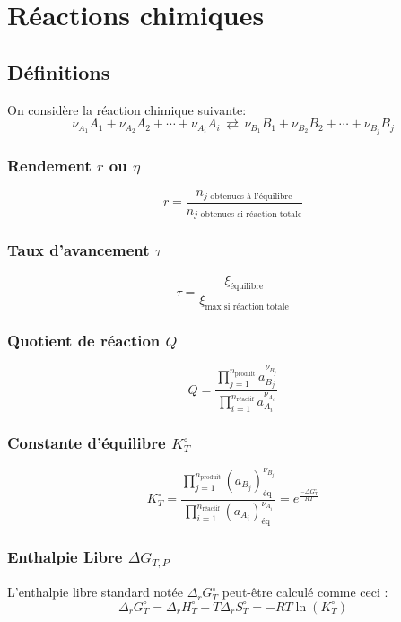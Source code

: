 \documentclass[a4paper,12pt]{article}
\begin{document}
      

        \clearpage

    \section{Réactions chimiques}

        \subsection{Définitions}
            On considère la réaction chimique suivante:
                $$ \nu_{A_1} A_1 + \nu_{A_2} A_2 + \cdots + \nu_{A_i} A_i \, \rightleftarrows \, \nu_{B_1} B_1 + \nu_{B_2} B_2 + \cdots + \nu_{B_j} B_j $$


            \subsubsection*{Rendement $r$ ou $\eta$}

                $$ \boxed{ r = \frac{n_{j \text{ obtenues à l'équilibre}}}{n_{j \text{ obtenues si réaction totale}}} } $$

            \subsubsection*{Taux d'avancement $\tau$}

                $$ \boxed{ \tau = \frac{\xi_{\text{équilibre}}}{\xi_{\text{max si réaction totale}}} } $$

            \subsubsection*{Quotient de réaction $Q$}

                $$ \boxed{ Q = \dfrac{\prod_{j=1}^{n_{\text{produit}}} a_{B_j}^{\nu_{B_j}}}{\prod_{i=1}^{n_{\text{réactif}}} a_{A_i}^{\nu_{A_i}}} } $$ 

            \subsubsection*{Constante d'équilibre $K_T^{\circ}$}

                $$ \boxed{ K_T^{\circ} = \dfrac{\prod_{j=1}^{n_{\text{produit}}} (a_{B_j})_{\text{éq}}^{\nu_{B_j}} }{\prod_{i=1}^{n_{\text{réactif}}} (a_{A_i})_{\text{éq}}^{\nu_{A_i}}} = e^{\frac{-\Delta G_T^{\circ}}{RT}} }$$

            \subsubsection*{Enthalpie Libre $\Delta G_{T,P}$}
                L'enthalpie libre standard notée $\Delta_r G_T^{\circ}$ peut-être calculé comme ceci :
                    $$ \boxed{ \Delta_r G_T^{\circ} = \Delta_r H_T^{\circ} - T \Delta_r S_T^{\circ} = -RT \ln{(K_T^{\circ})} } $$
\end{document}
